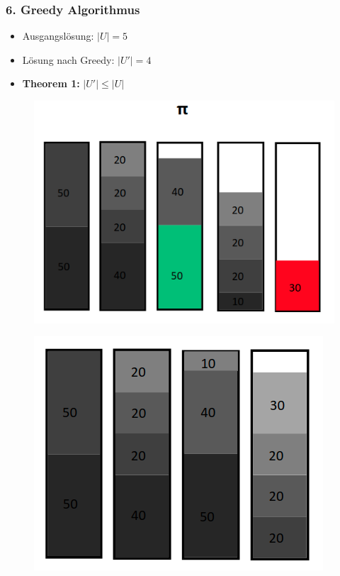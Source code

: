 \documentclass{beamer}
\begin{document}
\begin{frame}
\frametitle{6. Greedy Algorithmus}
\begin{footnotesize}
\begin{itemize}
\item Ausgangslösung: $\vert U \vert = 5$ 
\item Lösung nach Greedy: $\vert U' \vert = 4$ 
\item \textbf{Theorem 1:} $\vert U'\vert \leq \vert U \vert$
\end{itemize}
\end{footnotesize}
\begin{figure}[!htbp]
\begin{center}
\includegraphics[scale=0.21]{img/HC_5.png}
\end{center}
\end{figure}
\begin{figure}[!htbp]
\begin{center}
\includegraphics[scale=0.21]{img/HC_6.png}
\end{center}
\end{figure}


\end{frame}
\end{document}
